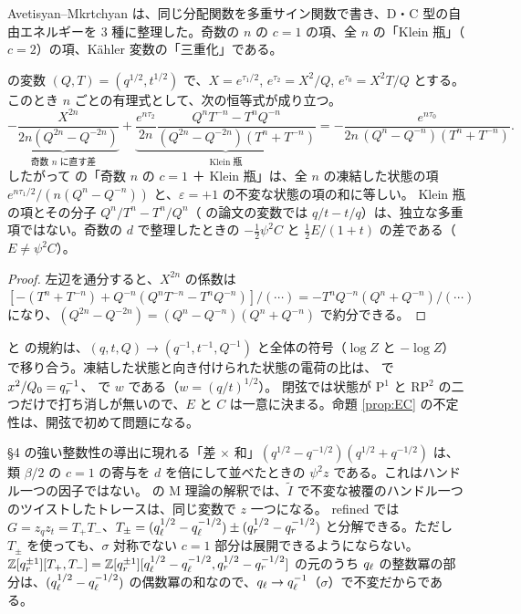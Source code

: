 Avetisyan--Mkrtchyan \cite{AM22} は、同じ分配関数を多重サイン関数で書き、D・C 型の自由エネルギーを 3 種に整理した。奇数の $n$ の $c = 1$ の項、全 $n$ の「Klein 瓶」（$c = 2$）の項、Kähler 変数の「三重化」である。
\begin{proposition}\label{prop:AM}
\cite{AM22} の変数 $(Q, T) = (q^{1/2}, t^{1/2})$ で、$X = e^{\tau_1/2}$, $e^{\tau_2} = X^2/Q$, $e^{\tau_0} = X^2 T/Q$ とする。このとき $n$ ごとの有理式として、次の恒等式が成り立つ。
\[
\underbrace{-\frac{X^{2n}}{2n(Q^{2n} - Q^{-2n})}}_{\text{奇数 $n$ に直す差}}
+ \underbrace{\frac{e^{n\tau_2}}{2n}\frac{Q^n T^{-n} - T^n Q^{-n}}{(Q^{2n} - Q^{-2n})(T^n + T^{-n})}}_{\text{Klein 瓶}}
= -\frac{e^{n\tau_0}}{2n\,(Q^n - Q^{-n})(T^n + T^{-n})} .
\]
したがって \cite{AM22} の「奇数 $n$ の $c = 1$ ＋ Klein 瓶」は、全 $n$ の凍結した状態の項 $e^{n\tau_1/2}/(n(Q^n - Q^{-n}))$ と、$\varepsilon = +1$ の不変な状態の項の和に等しい。
Klein 瓶の項とその分子 $Q^n/T^n - T^n/Q^n$（\cite{AM22} の論文の変数では $q/t - t/q$）は、独立な多重項ではない。奇数の $d$ で整理したときの $-\tfrac12\psi^2 C$ と $\tfrac12 E/(1+t)$ の差である（$E \ne \psi^2 C$）。
\end{proposition}
\begin{proof}
左辺を通分すると、$X^{2n}$ の係数は $[-(T^n + T^{-n}) + Q^{-n}(Q^nT^{-n} - T^nQ^{-n})]/(\cdots) = -T^nQ^{-n}(Q^n + Q^{-n})/(\cdots)$ になり、$(Q^{2n} - Q^{-2n}) = (Q^n - Q^{-n})(Q^n + Q^{-n})$ で約分できる。
\end{proof}

\begin{remark}
\cite{AM22} と \cite{AgSc12} の規約は、$(q, t, Q) \to (q^{-1}, t^{-1}, Q^{-1})$ と全体の符号（$\log Z$ と $-\log Z$）で移り合う。凍結した状態と向き付けられた状態の電荷の比は、\cite{AgSc12} で $x^2/Q_0 = q_r^{-1}$、\cite{AM22} で $w$ である（$w = (q/t)^{1/2}$）。
閉弦では状態が P$^1$ と RP$^2$ の二つだけで打ち消しが無いので、$E$ と $C$ は一意に決まる。命題 \ref{prop:EC} の不定性は、開弦で初めて問題になる。
\end{remark}

\begin{remark}[ハンドルの因子]
\cite{AgSc12} §4 の強い整数性の導出に現れる「差 $\times$ 和」$(q^{1/2} - q^{-1/2})(q^{1/2} + q^{-1/2})$ は、類 $\beta/2$ の $c = 1$ の寄与を $d$ を倍にして並べたときの $\psi^2 z$ である。これはハンドル一つの因子ではない。
\cite{PU14} の M 理論の解釈では、$\tilde I$ で不変な被覆のハンドル一つのツイストしたトレースは、同じ変数で $z$ 一つになる。
refined では $G = z_q z_t = T_+T_-$、$T_\pm = (q_\ell^{1/2} - q_\ell^{-1/2}) \pm (q_r^{1/2} - q_r^{-1/2})$ と分解できる。ただし $T_\pm$ を使っても、$\sigma$ 対称でない $c = 1$ 部分は展開できるようにならない。
$\mathbb{Z}[q_r^{\pm 1}][T_+, T_-] = \mathbb{Z}[q_r^{\pm1}][q_\ell^{1/2} - q_\ell^{-1/2}, q_r^{1/2} - q_r^{-1/2}]$ の元のうち $q_\ell$ の整数冪の部分は、$(q_\ell^{1/2} - q_\ell^{-1/2})$ の偶数冪の和なので、$q_\ell \to q_\ell^{-1}$（$\sigma$）で不変だからである。
\end{remark}
